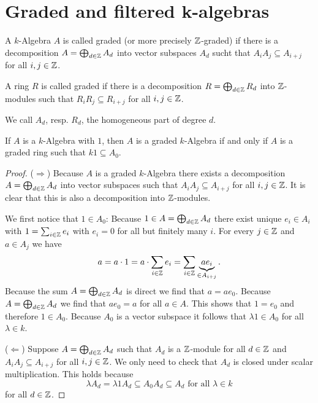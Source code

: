 \section{Graded and filtered k-algebras}


\begin{defi}
 A $k$-Algebra $A$ is called graded (or more precisely $\mathbb{Z}$-graded) if there is a decomposition $A = \bigoplus_{d \in \mathbb{Z}} A_d$ into vector subspaces $A_d$ sucht that $A_i A_j \subseteq A_{i+j}$ for all $i,j \in \mathbb{Z}$.
 
 A ring $R$ is called graded if there is a decomposition $R = \bigoplus_{d \in \mathbb{Z}} R_d$ into $\mathbb{Z}$-modules such that $R_i R_j \subseteq R_{i+j}$ for all $i,j \in \mathbb{Z}$.
 
 We call $A_d$, resp. $R_d$, the homogeneous part of degree $d$.
\end{defi}

\begin{rem}
 If $A$ is a $k$-Algebra with $1$, then $A$ is a graded $k$-Algebra if and only if $A$ is a graded ring such that $k1 \subseteq A_0$.
\end{rem}
\begin{proof}
 ($\Rightarrow$) Because $A$ is a graded $k$-Algebra there exists a decomposition $A = \bigoplus_{d \in \mathbb{Z}} A_d$ into vector subspaces such that $A_i A_j \subseteq A_{i+j}$ for all $i,j \in \mathbb{Z}$. It is clear that this is also a decomposition into $\mathbb{Z}$-modules.
 
 We first notice that $1 \in A_0$: Because $1 \in A = \bigoplus_{d \in \mathbb{Z}} A_d$ there exist unique $e_i \in A_i$ with $1 = \sum_{i \in \mathbb{Z}} e_i$ with $e_i = 0$ for all but finitely many $i$. For every $j \in \mathbb{Z}$ and $a \in A_j$ we have
 \[
  a = a \cdot 1 = a \cdot \sum_{i \in \mathbb{Z}} e_i = \sum_{i \in \mathbb{Z}} \underbrace{a e_i}_{\in A_{i+j}}.
 \]
 Because the sum $A = \bigoplus_{d \in \mathbb{Z}} A_d$ is direct we find that $a = a e_0$. Because $A = \bigoplus_{d \in \mathbb{Z}} A_d$ we find that $a e_0 = a$ for all $a \in A$. This shows that $1 = e_0$ and therefore $1 \in A_0$. Because $A_0$ is a vector subspace it follows that $\lambda 1 \in A_0$ for all $\lambda \in k$.
 
 ($\Leftarrow$) Suppose $A = \bigoplus_{d \in \mathbb{Z}} A_d$ such that $A_d$ is a $\mathbb{Z}$-module for all $d \in \mathbb{Z}$ and $A_i A_j \subseteq A_{i+j}$ for all $i,j \in \mathbb{Z}$. We only need to check that $A_d$ is closed under scalar multiplication. This holds because
 \[
  \lambda A_d = \lambda 1 A_d \subseteq A_0 A_d \subseteq A_d \text{ for all } \lambda \in k
 \]
 for all $d \in \mathbb{Z}$.
\end{proof}


